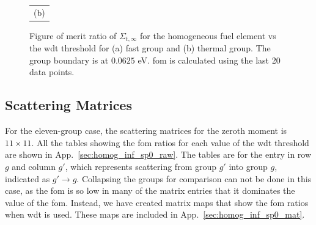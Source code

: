 \begin{figure}[hbtp]
\begin{tabular}{c}
    (b) 
  \end{tabular}
  \caption[Figure of merit ratio of the $\Sigma_{t,\infty}$ for the
  homogeneous fuel element]{Figure of merit ratio of
    $\Sigma_{t,\infty}$ for the homogeneous fuel element vs the \gls{wdt}
    threshold for (a) fast group and (b) thermal group. The group
    boundary is at $0.0625$ eV. \gls{fom} is calculated using the last
    20 data points.}
  \label{fig:homog_inf_tot}
\end{figure}

\subsection{Scattering Matrices}
\label{sec:homog_inf_sp0}

For the eleven-group case, the scattering matrices for the zeroth
moment is $11 \times 11$. All the tables showing the \gls{fom}
ratios for each value of the \gls{wdt} threshold are shown in
App.~\ref{sec:homog_inf_sp0_raw}. The tables are for the entry in row $g$
and column $g'$, which represents scattering from group $g'$ into
group $g$, indicated as $g' \to g$. Collapsing the groups for
comparison can not be done in this case, as the \gls{fom} is so low in
many of the matrix entries that it dominates the value of the
\gls{fom}. Instead, we have created matrix maps that show the
\gls{fom} ratios when \gls{wdt} is used. These maps are included in
App.~\ref{sec:homog_inf_sp0_mat}. 

